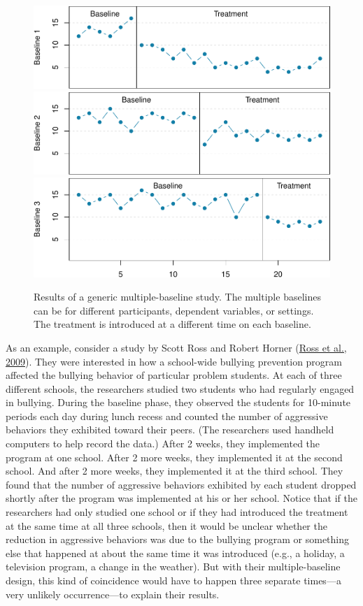\documentclass[
]{krantz}
\begin{document}
\begin{figure}

{\centering \includegraphics[width=0.7\linewidth]{10-single-N_files/figure-latex/multiple-1} \includegraphics[width=0.7\linewidth]{10-single-N_files/figure-latex/multiple-2} \includegraphics[width=0.7\linewidth]{10-single-N_files/figure-latex/multiple-3} 

}

\caption{Results of a generic multiple-baseline study. The multiple baselines can be for different participants, dependent variables, or settings. The treatment is introduced at a different time on each baseline.}\label{fig:multiple}
\end{figure}

As an example, consider a study by Scott Ross and Robert Horner (\protect\hyperlink{ref-ross2009bully}{Ross et al., 2009}). They were interested in how a school-wide bullying prevention program affected the bullying behavior of particular problem students. At each of three different schools, the researchers studied two students who had regularly engaged in bullying. During the baseline phase, they observed the students for 10-minute periods each day during lunch recess and counted the number of aggressive behaviors they exhibited toward their peers. (The researchers used handheld computers to help record the data.) After 2 weeks, they implemented the program at one school. After 2 more weeks, they implemented it at the second school. And after 2 more weeks, they implemented it at the third school. They found that the number of aggressive behaviors exhibited by each student dropped shortly after the program was implemented at his or her school. Notice that if the researchers had only studied one school or if they had introduced the treatment at the same time at all three schools, then it would be unclear whether the reduction in aggressive behaviors was due to the bullying program or something else that happened at about the same time it was introduced (e.g., a holiday, a television program, a change in the weather). But with their multiple-baseline design, this kind of coincidence would have to happen three separate times---a very unlikely occurrence---to explain their results.
\end{document}
